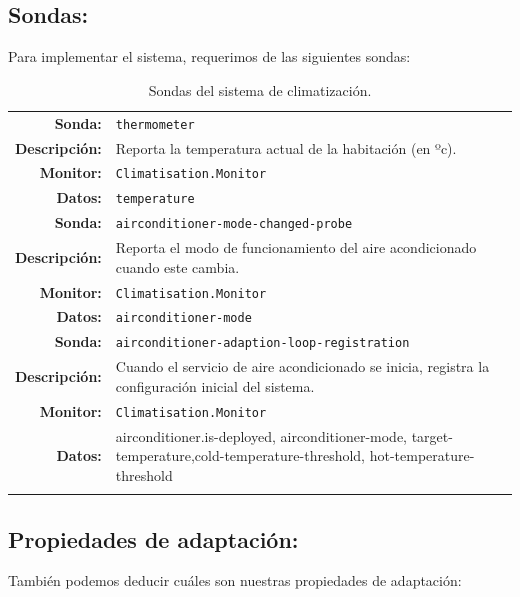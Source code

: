 \subsection{Sondas:}

Para implementar el sistema, requerimos de las siguientes sondas:

\begin{longtable}{|r p{11.5cm}|}
    \hline
    \textbf{Sonda:} & \texttt{thermometer}  \\
    \textbf{Descripción:} & Reporta la temperatura actual de la habitación (en ºc). \\
    \textbf{Monitor:} & \texttt{Climatisation.Monitor} \\
    \textbf{Datos:} & \texttt{temperature} \\
    \hline
    \textbf{Sonda:} & \texttt{airconditioner-mode-changed-probe}  \\
    \textbf{Descripción:} & Reporta el modo de funcionamiento del aire acondicionado cuando este cambia. \\
    \textbf{Monitor:} & \texttt{Climatisation.Monitor} \\
    \textbf{Datos:} & \texttt{airconditioner-mode} \\
    \hline
    \textbf{Sonda:} & \texttt{airconditioner-adaption-loop-registration}  \\
    \textbf{Descripción:} & Cuando el servicio de aire acondicionado se inicia, registra la configuración inicial del sistema. \\
    \textbf{Monitor:} & \texttt{Climatisation.Monitor} \\
    \textbf{Datos:} &  \ttfamily\selectfont airconditioner.is-deployed, airconditioner-mode, target-temperature,cold-temperature-threshold, hot-temperature-threshold \\
    \hline

    \caption{Sondas del sistema de climatización.}
    \label{tab:climatisation-probes}
\end{longtable}

\subsection{Propiedades de adaptación:}

También podemos deducir cuáles son nuestras propiedades de adaptación:

